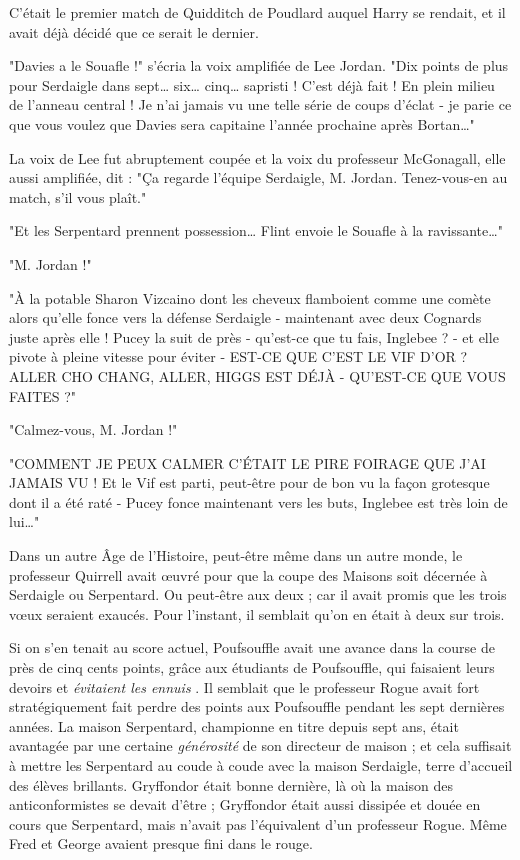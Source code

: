 C'était le premier match de Quidditch de Poudlard auquel Harry se rendait, et il avait déjà décidé que ce serait le dernier.

"Davies a le Souafle !" s'écria la voix amplifiée de Lee Jordan. "Dix points de plus pour Serdaigle dans sept… six… cinq… sapristi ! C'est déjà fait ! En plein milieu de l'anneau central ! Je n'ai jamais vu une telle série de coups d'éclat - je parie ce que vous voulez que Davies sera capitaine l'année prochaine après Bortan…"

La voix de Lee fut abruptement coupée et la voix du professeur McGonagall, elle aussi amplifiée, dit : "Ça regarde l'équipe Serdaigle, M. Jordan. Tenez-vous-en au match, s'il vous plaît."

"Et les Serpentard prennent possession… Flint envoie le Souafle à la ravissante…"

"M. Jordan !"

"À la potable Sharon Vizcaino dont les cheveux flamboient comme une comète alors qu'elle fonce vers la défense Serdaigle - maintenant avec deux Cognards juste après elle ! Pucey la suit de près - qu'est-ce que tu fais, Inglebee ? - et elle pivote à pleine vitesse pour éviter - EST-CE QUE C'EST LE VIF D'OR ? ALLER CHO CHANG, ALLER, HIGGS EST DÉJÀ - QU'EST-CE QUE VOUS FAITES ?"

"Calmez-vous, M. Jordan !"

"COMMENT JE PEUX CALMER C'ÉTAIT LE PIRE FOIRAGE QUE J'AI JAMAIS VU ! Et le Vif est parti, peut-être pour de bon vu la façon grotesque dont il a été raté - Pucey fonce maintenant vers les buts, Inglebee est très loin de lui…"

Dans un autre Âge de l'Histoire, peut-être même dans un autre monde, le professeur Quirrell avait œuvré pour que la coupe des Maisons soit décernée à Serdaigle ou Serpentard. Ou peut-être aux deux ; car il avait promis que les trois vœux seraient exaucés. Pour l'instant, il semblait qu'on en était à deux sur trois.

Si on s'en tenait au score actuel, Poufsouffle avait une avance dans la course de près de cinq cents points, grâce aux étudiants de Poufsouffle, qui faisaient leurs devoirs et \emph{évitaient les ennuis} . Il semblait que le professeur Rogue avait fort stratégiquement fait perdre des points aux Poufsouffle pendant les sept dernières années. La maison Serpentard, championne en titre depuis sept ans, était avantagée par une certaine \emph{générosité}  de son directeur de maison ; et cela suffisait à mettre les Serpentard au coude à coude avec la maison Serdaigle, terre d'accueil des élèves brillants. Gryffondor était bonne dernière, là où la maison des anticonformistes se devait d'être ; Gryffondor était aussi dissipée et douée en cours que Serpentard, mais n'avait pas l'équivalent d'un professeur Rogue. Même Fred et George avaient presque fini dans le rouge.

